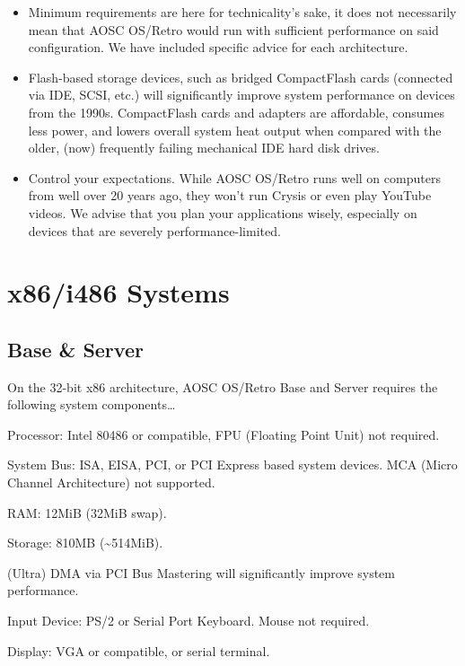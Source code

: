 \documentclass[a5paper,twosided,11pt]{book}
\begin{document}
    \begin{itemize}
        \item Minimum requirements are here for technicality's sake,
            it does not necessarily mean that AOSC OS/Retro would run with sufficient performance
            on said configuration. We have included specific advice for each architecture.
        \item Flash-based storage devices, such as bridged CompactFlash cards
            (connected via IDE, SCSI, etc.) will significantly improve system performance on devices from the 1990s.
            CompactFlash cards and adapters are affordable, consumes less power,
            and lowers overall system heat output when compared with the older,
            (now) frequently failing mechanical IDE hard disk drives.
        \item Control your expectations. While AOSC OS/Retro runs well on computers from well over 20 years ago,
            they won't run Crysis or even play YouTube videos. We advise that you plan your applications wisely,
            especially on devices that are severely performance-limited.
    \end{itemize}


    \section{x86/i486 Systems}

    \subsection{Base \& Server}

    On the 32-bit x86 architecture, AOSC OS/Retro Base and Server requires the following system components\ldots

    \begin{compactitem}
        \item Processor: Intel 80486 or compatible, FPU (Floating Point Unit) not required.
        \item System Bus: ISA, EISA, PCI, or PCI Express based system devices. MCA (Micro Channel Architecture) not supported.
        \item RAM: 12MiB (32MiB swap).
        \item Storage: 810MB ({\textasciitilde}514MiB).
            \begin{compactitem}
                \item (Ultra) DMA via PCI Bus Mastering will significantly improve system performance.
            \end{compactitem}
        \item Input Device: PS/2 or Serial Port Keyboard. Mouse not required.
        \item Display: VGA or compatible, or serial terminal.
    \end{compactitem}
\end{document}
